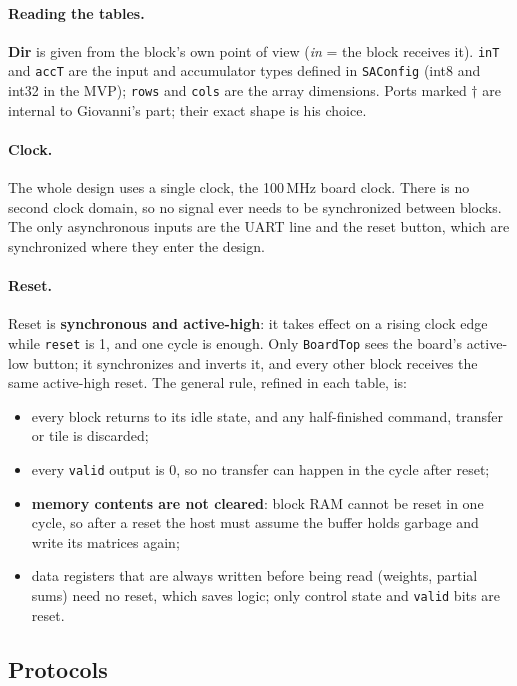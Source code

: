 \documentclass{article}
\begin{document}
\paragraph{Reading the tables.}
\textbf{Dir} is given from the block's own point of view (\emph{in} = the block receives it).
\texttt{inT} and \texttt{accT} are the input and accumulator types defined in \texttt{SAConfig}
(int8 and int32 in the MVP); \texttt{rows} and \texttt{cols} are the array dimensions.
Ports marked $\dagger$ are internal to Giovanni's part; their exact shape is his choice.

\paragraph{Clock.}
The whole design uses a single clock, the 100\,MHz board clock. There is no second clock domain,
so no signal ever needs to be synchronized between blocks. The only asynchronous inputs are the
UART line and the reset button, which are synchronized where they enter the design.

\paragraph{Reset.}
Reset is \textbf{synchronous and active-high}: it takes effect on a rising clock edge while
\texttt{reset} is 1, and one cycle is enough. Only \texttt{BoardTop} sees the board's active-low
button; it synchronizes and inverts it, and every other block receives the same active-high reset.
The general rule, refined in each table, is:
\begin{itemize}
  \item every block returns to its idle state, and any half-finished command, transfer or tile is discarded;
  \item every \texttt{valid} output is 0, so no transfer can happen in the cycle after reset;
  \item \textbf{memory contents are not cleared}: block RAM cannot be reset in one cycle, so after a reset
        the host must assume the buffer holds garbage and write its matrices again;
  \item data registers that are always written before being read (weights, partial sums) need no reset,
        which saves logic; only control state and \texttt{valid} bits are reset.
\end{itemize}

\subsection*{Protocols}
\end{document}
